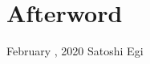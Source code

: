 \chapter*{Afterword} 


\bigskip


\begin{flushright}
February \todo{}, 2020 \quad Satoshi Egi
\end{flushright}

